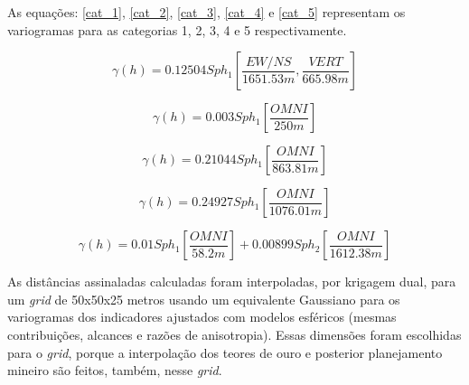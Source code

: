 \begin{figure}[H]
\end{figure}

As equações: \autoref{cat_1}, \autoref{cat_2}, \autoref{cat_3}, \autoref{cat_4} e \autoref{cat_5} representam os variogramas para as categorias 1, 2, 3, 4 e 5 respectivamente.

\begin{equation}
    \label{cat_1}
    \gamma(h)=0.12504Sph_{1} \left[ \frac{EW/NS}{1651.53 m},\frac{VERT}{665.98 m} \right]
\end{equation}

\begin{equation}
    \label{cat_2}
    \gamma(h)=0.003Sph_{1} \left[ \frac{OMNI}{250 m} \right]
\end{equation}

\begin{equation}
    \label{cat_3}
    \gamma(h)=0.21044Sph_{1} \left[ \frac{OMNI}{863.81 m} \right]
\end{equation}

\begin{equation}
    \label{cat_4}
    \gamma(h)=0.24927Sph_{1} \left[ \frac{OMNI}{1076.01 m} \right]
\end{equation}

\begin{equation}
    \label{cat_5}
    \gamma(h)=0.01Sph_{1} \left[ \frac{OMNI}{58.2 m} \right]+0.00899Sph_{2} \left[ \frac{OMNI}{1612.38 m} \right]
\end{equation}

As distâncias assinaladas calculadas foram interpoladas, por krigagem dual, para um \textit{grid} de 50x50x25 metros usando um equivalente Gaussiano para os variogramas dos indicadores ajustados com modelos esféricos (mesmas contribuições, alcances e razões de anisotropia). Essas dimensões foram escolhidas para o \textit{grid}, porque a interpolação dos teores de ouro e posterior planejamento mineiro são feitos, também, nesse \textit{grid}.

